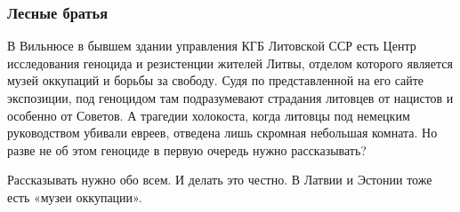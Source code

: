  
 
 
 
 
\subsubsection{Лесные братья}

В Вильнюсе в бывшем здании управления КГБ Литовской ССР есть Центр исследования
геноцида и резистенции жителей Литвы, отделом которого является музей оккупаций
и борьбы за свободу. Судя по представленной на его сайте экспозиции, под
геноцидом там подразумевают страдания литовцев от нацистов и особенно от
Советов. А трагедии холокоста, когда литовцы под немецким руководством убивали
евреев, отведена лишь скромная небольшая комната. Но разве не об этом геноциде
в первую очередь нужно рассказывать?

Рассказывать нужно обо всем. И делать это честно. В Латвии и Эстонии тоже есть
«музеи оккупации».
